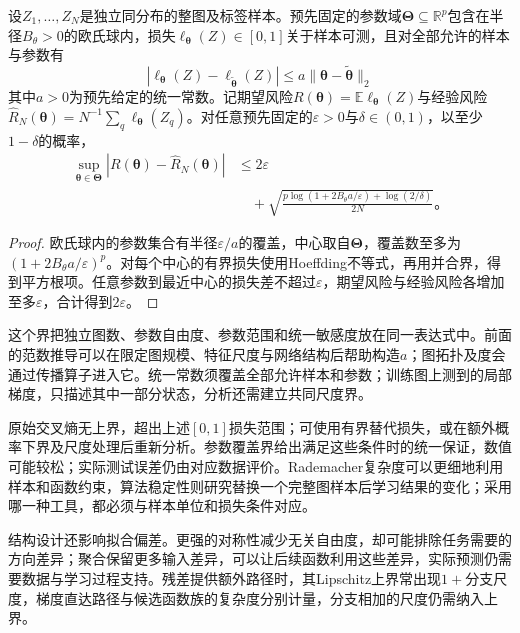 \begin{theorem}[有界参数图预测的覆盖界]
\label{thm:gnn-cover-generalization}
设$Z_1,\ldots,Z_N$是独立同分布的整图及标签样本。预先固定的参数域$\bm{\Theta}\subseteq\mathbb{R}^{p}$包含在半径$B_\theta>0$的欧氏球内，损失$\ell_{\bm{\theta}}(Z)\in[0,1]$关于样本可测，且对全部允许的样本与参数有
\[
  |\ell_{\bm{\theta}}(Z)-\ell_{\widetilde{\bm{\theta}}}(Z)|
    \leq a\lVert\bm{\theta}-\widetilde{\bm{\theta}}\rVert_2
\]
其中$a>0$为预先给定的统一常数。记期望风险$R(\bm{\theta})=\mathbb{E}\ell_{\bm{\theta}}(Z)$与经验风险$\widehat R_N(\bm{\theta})=N^{-1}\sum_q\ell_{\bm{\theta}}(Z_q)$。对任意预先固定的$\varepsilon>0$与$\delta\in(0,1)$，以至少$1-\delta$的概率，
\begin{equation}
  \begin{aligned}
    \sup_{\bm{\theta}\in\bm{\Theta}}
      |R(\bm{\theta})-\widehat R_N(\bm{\theta})|
      &\leq2\varepsilon\\
      &\quad+\sqrt{\frac{p\log(1+2B_\theta a/\varepsilon)
        +\log(2/\delta)}{2N}}\text{。}
  \end{aligned}
  \label{eq:gnn-cover-risk}
\end{equation}
\end{theorem}
\begin{proof}
欧氏球内的参数集合有半径$\varepsilon/a$的覆盖，中心取自$\bm{\Theta}$，覆盖数至多为$(1+2B_\theta a/\varepsilon)^p$。对每个中心的有界损失使用Hoeffding不等式，再用并合界，得到平方根项。任意参数到最近中心的损失差不超过$\varepsilon$，期望风险与经验风险各增加至多$\varepsilon$，合计得到$2\varepsilon$。
\end{proof}

这个界把独立图数、参数自由度、参数范围和统一敏感度放在同一表达式中。前面的范数推导可以在限定图规模、特征尺度与网络结构后帮助构造$a$；图拓扑及度会通过传播算子进入它。统一常数须覆盖全部允许样本和参数；训练图上测到的局部梯度，只描述其中一部分状态，分析还需建立共同尺度界。

原始交叉熵无上界，超出上述$[0,1]$损失范围；可使用有界替代损失，或在额外概率下界及尺度处理后重新分析。参数覆盖界给出满足这些条件时的统一保证，数值可能较松；实际测试误差仍由对应数据评价。Rademacher复杂度可以更细地利用样本和函数约束，算法稳定性则研究替换一个完整图样本后学习结果的变化；采用哪一种工具，都必须与样本单位和损失条件对应。

结构设计还影响拟合偏差。更强的对称性减少无关自由度，却可能排除任务需要的方向差异；聚合保留更多输入差异，可以让后续函数利用这些差异，实际预测仍需要数据与学习过程支持。残差提供额外路径时，其Lipschitz上界常出现$1+$分支尺度，梯度直达路径与候选函数族的复杂度分别计量，分支相加的尺度仍需纳入上界。

